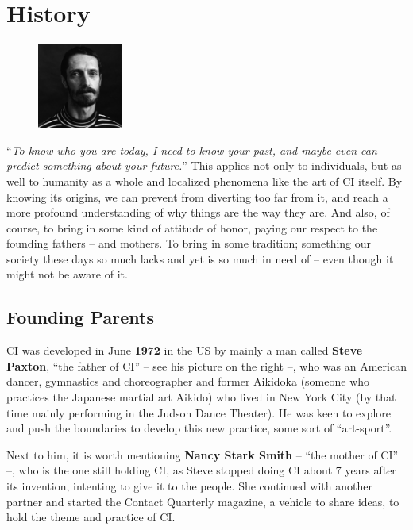\chapter{History}\label{ch:history}

\begin{figure}
\centering
\includegraphics[width=0.25\textwidth]{images/history}
\end{figure}

``\textit{To know who you are today, I need to know your past, and maybe even can predict something about your future.}''
This applies not only to individuals, but as well to humanity as a whole and localized phenomena like the art of CI itself.
By knowing its origins, we can prevent from diverting too far from it, and reach a more profound understanding of why things are the way they are.
And also, of course, to bring in some kind of attitude of honor, paying our respect to the founding fathers -- and mothers.
To bring in some tradition; something our society these days so much lacks and yet is so much in need of -- even though it might not be aware of it.

\section{Founding Parents}\label{sec:founding-parents}

CI was developed in June \textbf{1972} in the US by mainly a man called \textbf{Steve Paxton}, ``the father of CI'' -- see his picture on the right --, who was an American dancer, gymnastics and choreographer and former Aikidoka (someone who practices the Japanese martial art Aikido) who lived in New York City (by that time mainly performing in the Judson Dance Theater).
He was keen to explore and push the boundaries to develop this new practice, some sort of ``art-sport''.

Next to him, it is worth mentioning \textbf{Nancy Stark Smith} -- ``the mother of CI'' --, who is the one still holding CI, as Steve stopped doing CI about 7 years after its invention, intenting to give it to the people.
She continued with another partner and started the Contact Quarterly magazine, a vehicle to share ideas, to hold the theme and practice of CI\@.

